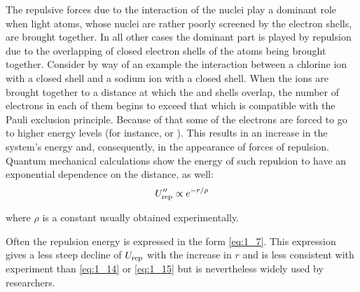 The repulsive forces due to the interaction of the nuclei play a dominant role when light atoms, whose nuclei are rather poorly screened by the electron shells, are brought together. In all other cases the dominant part is played by repulsion due to the overlapping of closed electron shells of the atoms being brought together. Consider by way of an example the interaction between a chlorine ion with a closed  shell and a sodium ion with a closed  shell. When the ions are brought together to a distance at which the  and  shells overlap, the number of electrons in each of them begins to exceed that which is compatible with the Pauli exclusion principle. Because of that some of the electrons are forced to go to higher energy levels (for instance,  or ). This results in an increase in the system's energy and, consequently, in the appearance of forces of repulsion. Quantum mechanical calculations show the energy of such repulsion to have an exponential dependence on the distance, as well:
\begin{equation}\label{eq:1_15}
	U_{\text{rep}}'' \propto e^{-r/\rho}
\end{equation}

\noindent
where $\rho$ is a constant usually obtained experimentally.

Often the repulsion energy is expressed in the form \eqref{eq:1_7}. This expression gives a less steep decline of $U_{\text{rep}}$ with the increase in $r$ and is less consistent with experiment than \eqref{eq:1_14} or \eqref{eq:1_15} but is nevertheless widely used by researchers.

